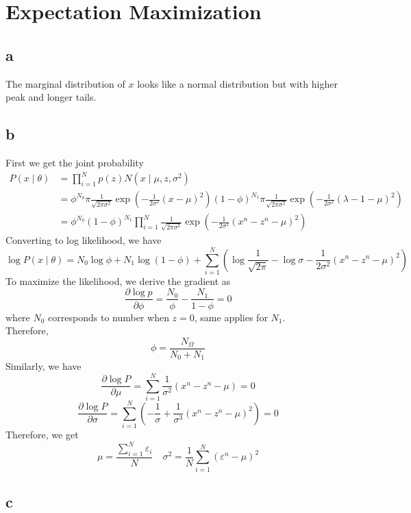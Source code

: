 \documentclass{article}
\begin{document}
\newpage

\section{Expectation Maximization}

\subsection*{a}

The marginal distribution of $x$ looks like a normal distribution but with higher peak and longer tails.

\subsection*{b}

First we get the joint probability
$$
\begin{aligned}
P(x \mid \theta) &=\prod_{i=1}^{N} p(z) N\left(x \mid \mu, z, \sigma^{2}\right) \\
&=\phi^{N_{0}} \pi \frac{1}{\sqrt{2 \pi \sigma^{2}}} \exp \left(-\frac{1}{2 \sigma^{2}}(x-\mu)^{2}\right)(1-\phi)^{N_{1}} \pi \frac{1}{\sqrt{2 \pi \sigma^{2}}} \exp \left(-\frac{1}{2 \sigma^{2}}(\lambda-1-\mu)^{2}\right) \\
&=\phi^{N_{0}}(1-\phi)^{N_{1}} \prod_{i=1}^{N} \frac{1}{\sqrt{2 \pi \sigma^{2}}} \exp \left(-\frac{1}{2 \sigma^{2}}\left(x^{n}-z^{n}-\mu\right)^{2}\right)
\end{aligned}
$$
Converting to log likelihood, we have
$$
\log P(x \mid \theta)=N_{0} \log \phi+N_{1} \log (1-\phi)+\sum_{i=1}^{N}\left(\log \frac{1}{\sqrt{2 \pi}}-\log \sigma-\frac{1}{2 \sigma^{2}}\left(x^{n}-z^{n}-\mu\right)^{2}\right)
$$
To maximize the likelihood, we derive the gradient as
$$
\frac{\partial \log p}{\partial \phi}=\frac{N_{0}}{\phi}-\frac{N_{1}}{1-\phi}=0
$$
where $N_0$ corresponds to number when $z = 0$, same applies for $N_1$. \\
Therefore,
$$\phi=\frac{N_{\Omega}}{N_0+N_1}$$
Similarly, we have
$$
\frac{\partial \log P}{\partial \mu}=\sum_{i=1}^{N} \frac{1}{\sigma^{2}}\left(x^{n}-z^{n}-\mu\right)=0 
$$
$$
\frac{\partial \log P}{\partial \sigma}=\sum_{i=1}^{N}\left(-\frac{1}{\sigma}+\frac{1}{\sigma^{3}}\left(x^{n}-z^{n}-\mu\right)^{2}\right)=0
$$
Therefore, we get
$$\mu = \frac{\sum_{i=1}^{N}\varepsilon_i}{N} \quad \sigma^2 = \frac{1}{N}\sum_{i=1}^{N}(\varepsilon^n-\mu)^2$$

\subsection*{c}
\end{document}
